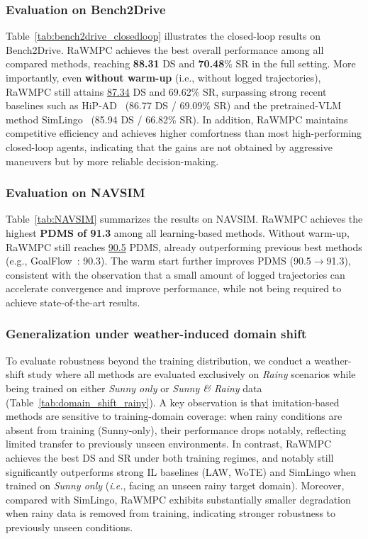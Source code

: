 \documentclass[twocolumn]{template}
\theoremstyle{thmstyleone}%
\theoremstyle{thmstyletwo}%
\theoremstyle{thmstylethree}%
\begin{document}
\subsubsection{Evaluation on Bench2Drive}
Table~\ref{tab:bench2drive_closedloop} illustrates the closed-loop results on Bench2Drive.
RaWMPC achieves the best overall performance among all compared methods, reaching \textbf{88.31} DS and \textbf{70.48}\% SR in the full setting.
More importantly, even \textbf{without warm-up} (i.e., without logged trajectories), RaWMPC still attains \underline{87.34} DS and 69.62\% SR, surpassing strong recent baselines such as HiP-AD~\cite{Hip_ad} (86.77 DS / 69.09\% SR) and the pretrained-VLM method SimLingo~\cite{Simlingo} (85.94 DS / 66.82\% SR).
In addition, RaWMPC maintains competitive efficiency and achieves higher comfortness than most high-performing closed-loop agents, indicating that the gains are not obtained by aggressive maneuvers but by more reliable decision-making.

\subsubsection{Evaluation on NAVSIM}
Table~\ref{tab:NAVSIM} summarizes the results on NAVSIM.
RaWMPC achieves the highest \textbf{PDMS of 91.3} among all learning-based methods.
Without warm-up, RaWMPC still reaches \underline{90.5} PDMS, already outperforming previous best methods (e.g., GoalFlow~\cite{Goalflow}: 90.3).
The warm start further improves PDMS (90.5$\rightarrow$91.3), consistent with the observation that a small amount of logged trajectories can accelerate convergence and improve performance, while not being required to achieve state-of-the-art results.

\subsubsection{Generalization under weather-induced domain shift}
To evaluate robustness beyond the training distribution, we conduct a weather-shift study where all methods are evaluated exclusively on \textit{Rainy} scenarios while being trained on either \textit{Sunny only} or \textit{Sunny \& Rainy} data (Table~\ref{tab:domain_shift_rainy}).
A key observation is that imitation-based methods are sensitive to training-domain coverage: when rainy conditions are absent from training (Sunny-only), their performance drops notably, reflecting limited transfer to previously unseen environments.
In contrast, RaWMPC achieves the best DS and SR under both training regimes, and notably still significantly outperforms strong IL baselines (LAW, WoTE) and SimLingo when trained on \textit{Sunny only} (\textit{i.e.}, facing an unseen rainy target domain).
Moreover, compared with SimLingo, RaWMPC exhibits substantially smaller degradation when rainy data is removed from training,
indicating stronger robustness to previously unseen conditions.
\end{document}
